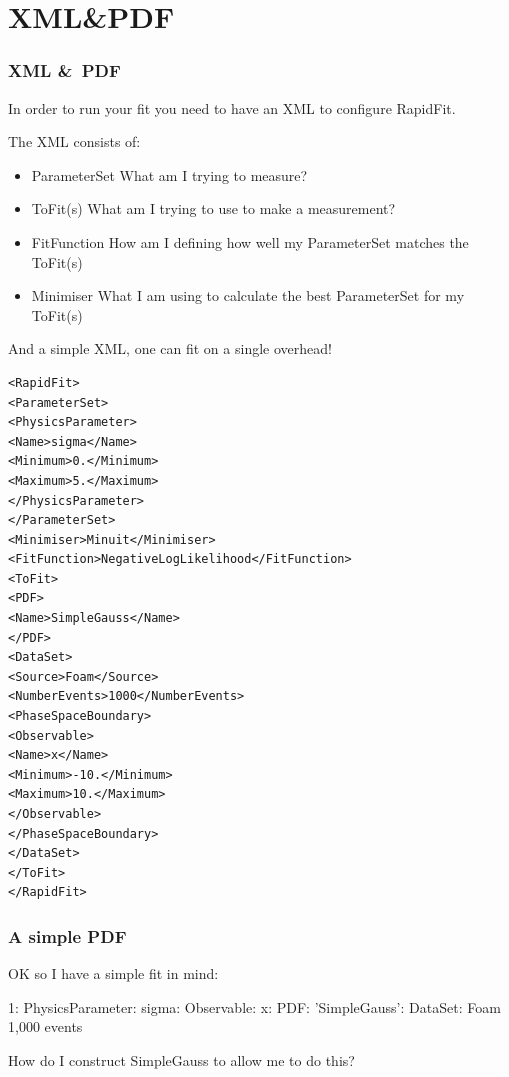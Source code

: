 \documentclass{beamer}
\begin{document}
\section{XML\&PDF}

\begin{frame}[fragile]
\frametitle{XML \&~PDF}
In order to run your fit you need to have an XML to configure RapidFit.\newline

The XML consists of:\small
\begin{itemize}
 \item ParameterSet\newline
 What am I trying to measure?\newline
 \item ToFit(s)\newline
 What am I trying to use to make a measurement?\newline
 \item FitFunction\newline
 How am I defining how well my ParameterSet matches the ToFit(s)\newline
 \item Minimiser\newline
 What I am using to calculate the best ParameterSet for my ToFit(s)
\end{itemize}


\end{frame}

\begin{frame}[fragile]
And a simple XML, one can fit on a single overhead!
\tiny
\begin{lstlisting}[tabsize=8]
<RapidFit>
<ParameterSet>
<PhysicsParameter>
<Name>sigma</Name>
<Minimum>0.</Minimum>
<Maximum>5.</Maximum>
</PhysicsParameter>
</ParameterSet>
<Minimiser>Minuit</Minimiser>
<FitFunction>NegativeLogLikelihood</FitFunction>
<ToFit>
<PDF>
<Name>SimpleGauss</Name>
</PDF>
<DataSet>
<Source>Foam</Source>
<NumberEvents>1000</NumberEvents>
<PhaseSpaceBoundary>
<Observable>
<Name>x</Name>
<Minimum>-10.</Minimum>
<Maximum>10.</Maximum>
</Observable>
</PhaseSpaceBoundary>
</DataSet>
</ToFit>
</RapidFit>
\end{lstlisting}

\end{frame}

\begin{frame}
\frametitle{A simple PDF}
OK so I have a simple fit in mind:\newline\newline

1: PhysicsParameter: sigma: Observable: x: PDF: 'SimpleGauss': DataSet: Foam 1,000 events\newline
\newline

How do I construct SimpleGauss to allow me to do this?

\end{frame}
\end{document}
